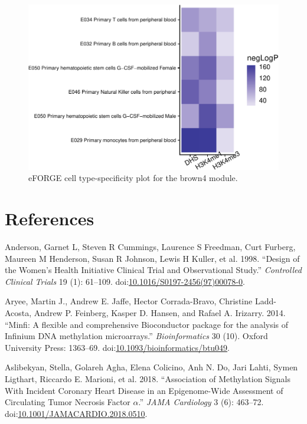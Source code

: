 \documentclass[]{article}
\theoremstyle{definition}
\theoremstyle{definition}
\theoremstyle{definition}
\theoremstyle{remark}
\begin{document}
\begin{figure}[htbp]
\centering
\includegraphics{../doc/figures/print-eforge-plots-1.pdf}
\caption{\label{fig:print-eforge-plots}eFORGE cell type-specificity plot for
the brown4 module.}
\end{figure}

\section*{References}\label{references}

Anderson, Garnet L, Steven R Cummings, Laurence S Freedman, Curt
Furberg, Maureen M Henderson, Susan R Johnson, Lewis H Kuller, et al.
1998. ``Design of the Women's Health Initiative Clinical Trial and
Observational Study.'' \emph{Controlled Clinical Trials} 19 (1):
61--109.
doi:\href{http://dx.doi.org/10.1016/S0197-2456(97)00078-0}{10.1016/S0197-2456(97)00078-0}.

Aryee, Martin J., Andrew E. Jaffe, Hector Corrada-Bravo, Christine
Ladd-Acosta, Andrew P. Feinberg, Kasper D. Hansen, and Rafael A.
Irizarry. 2014. ``Minfi: A flexible and comprehensive Bioconductor
package for the analysis of Infinium DNA methylation microarrays.''
\emph{Bioinformatics} 30 (10). Oxford University Press: 1363--69.
doi:\href{http://dx.doi.org/10.1093/bioinformatics/btu049}{10.1093/bioinformatics/btu049}.

Aslibekyan, Stella, Golareh Agha, Elena Colicino, Anh N. Do, Jari Lahti,
Symen Ligthart, Riccardo E. Marioni, et al. 2018. ``Association of
Methylation Signals With Incident Coronary Heart Disease in an
Epigenome-Wide Assessment of Circulating Tumor Necrosis Factor
\(\alpha\).'' \emph{JAMA Cardiology} 3 (6): 463--72.
doi:\href{http://dx.doi.org/10.1001/JAMACARDIO.2018.0510}{10.1001/JAMACARDIO.2018.0510}.
\end{document}
